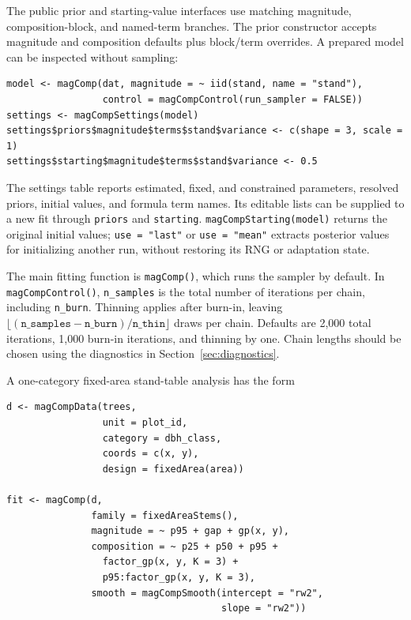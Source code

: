 \documentclass[11pt]{article}
\begin{document}
The public prior and starting-value interfaces use matching magnitude,
composition-block, and named-term branches. The prior constructor accepts
magnitude and composition defaults plus block/term overrides. A prepared model
can be inspected without sampling:
\begin{verbatim}
model <- magComp(dat, magnitude = ~ iid(stand, name = "stand"),
                 control = magCompControl(run_sampler = FALSE))
settings <- magCompSettings(model)
settings$priors$magnitude$terms$stand$variance <- c(shape = 3, scale = 1)
settings$starting$magnitude$terms$stand$variance <- 0.5
\end{verbatim}
The settings table reports estimated, fixed, and constrained parameters,
resolved priors, initial values, and formula term names. Its editable lists can
be supplied to a new fit through \texttt{priors} and \texttt{starting}.
\texttt{magCompStarting(model)} returns the original initial values;
\texttt{use = "last"} or \texttt{use = "mean"} extracts posterior values for
initializing another run, without restoring its RNG or adaptation state.

The main fitting function is \texttt{magComp()}, which runs the sampler by
default. In \texttt{magCompControl()}, \texttt{n\_samples} is the total
number of iterations per chain, including \texttt{n\_burn}. Thinning applies
after burn-in, leaving
\(\lfloor (\texttt{n\_samples}-\texttt{n\_burn})/\texttt{n\_thin}\rfloor\)
draws per chain. Defaults are 2,000 total iterations, 1,000 burn-in iterations,
and thinning by one. Chain lengths should be chosen using the diagnostics
in Section~\ref{sec:diagnostics}.

A one-category fixed-area
stand-table analysis has the form
\begin{verbatim}
d <- magCompData(trees,
                 unit = plot_id,
                 category = dbh_class,
                 coords = c(x, y),
                 design = fixedArea(area))

fit <- magComp(d,
               family = fixedAreaStems(),
               magnitude = ~ p95 + gap + gp(x, y),
               composition = ~ p25 + p50 + p95 +
                 factor_gp(x, y, K = 3) +
                 p95:factor_gp(x, y, K = 3),
               smooth = magCompSmooth(intercept = "rw2",
                                      slope = "rw2"))
\end{verbatim}
\end{document}

